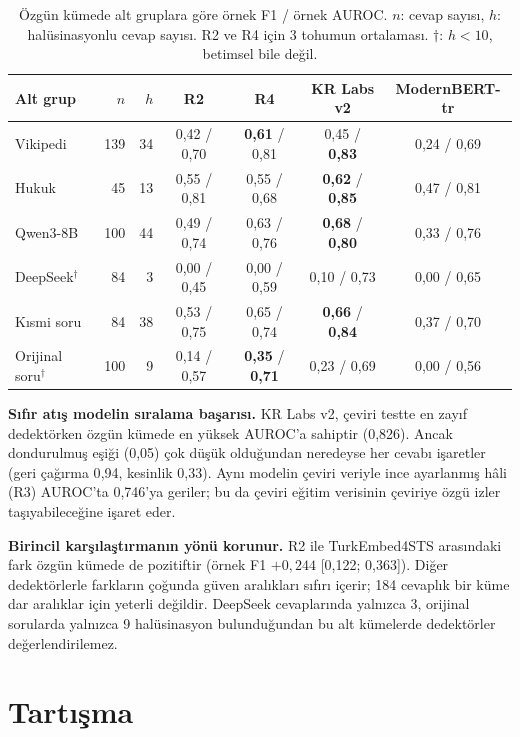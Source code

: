 \documentclass[conference,a4paper]{IEEEtran}
\begin{document}
\begin{table}[t]
\centering
\caption{Özgün kümede alt gruplara göre örnek F1 / örnek AUROC. $n$: cevap sayısı, $h$: halüsinasyonlu cevap sayısı. R2 ve R4 için 3 tohumun ortalaması. $\dagger$: $h<10$, betimsel bile değil.}
\label{tab:subgroups}
\scriptsize
\setlength{\tabcolsep}{3pt}
\begin{tabular}{@{}lrrcccc@{}}
\toprule
Alt grup & $n$ & $h$ & R2 & R4 & KR Labs v2 & ModernBERT-tr \\
\midrule
Vikipedi & 139 & 34 & 0,42 / 0,70 & \textbf{0,61} / 0,81 & 0,45 / \textbf{0,83} & 0,24 / 0,69 \\
Hukuk & 45 & 13 & 0,55 / 0,81 & 0,55 / 0,68 & \textbf{0,62} / \textbf{0,85} & 0,47 / 0,81 \\
\midrule
Qwen3-8B & 100 & 44 & 0,49 / 0,74 & 0,63 / 0,76 & \textbf{0,68} / \textbf{0,80} & 0,33 / 0,76 \\
DeepSeek$^\dagger$ & 84 & 3 & 0,00 / 0,45 & 0,00 / 0,59 & 0,10 / 0,73 & 0,00 / 0,65 \\
\midrule
Kısmi soru & 84 & 38 & 0,53 / 0,75 & 0,65 / 0,74 & \textbf{0,66} / \textbf{0,84} & 0,37 / 0,70 \\
Orijinal soru$^\dagger$ & 100 & 9 & 0,14 / 0,57 & \textbf{0,35} / \textbf{0,71} & 0,23 / 0,69 & 0,00 / 0,56 \\
\bottomrule
\end{tabular}
\end{table}

\textbf{Sıfır atış modelin sıralama başarısı.} KR Labs v2, çeviri testte en zayıf dedektörken özgün kümede en yüksek AUROC'a sahiptir (0{,}826). Ancak dondurulmuş eşiği (0{,}05) çok düşük olduğundan neredeyse her cevabı işaretler (geri çağırma 0{,}94, kesinlik 0{,}33). Aynı modelin çeviri veriyle ince ayarlanmış hâli (R3) AUROC'ta 0{,}746'ya geriler; bu da çeviri eğitim verisinin çeviriye özgü izler taşıyabileceğine işaret eder.

\textbf{Birincil karşılaştırmanın yönü korunur.} R2 ile TurkEmbed4STS arasındaki fark özgün kümede de pozitiftir (örnek F1 $+0{,}244$ [0{,}122; 0{,}363]). Diğer dedektörlerle farkların çoğunda güven aralıkları sıfırı içerir; 184 cevaplık bir küme dar aralıklar için yeterli değildir. DeepSeek cevaplarında yalnızca 3, orijinal sorularda yalnızca 9 halüsinasyon bulunduğundan bu alt kümelerde dedektörler değerlendirilemez.

\section{Tartışma}
\end{document}

